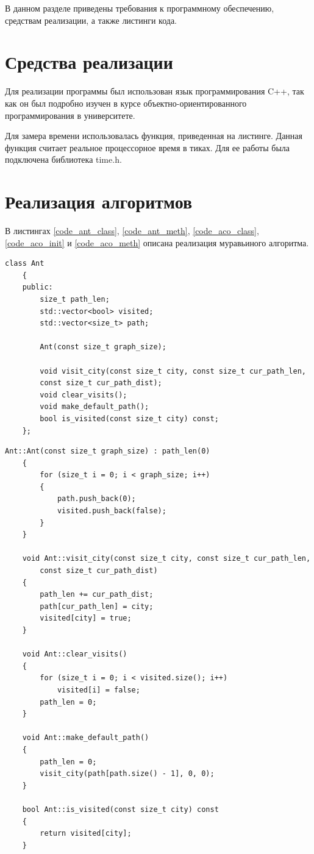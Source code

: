\documentclass[12pt, a4paper]{report}
\begin{document}
    В данном разделе приведены требования к программному обеспечению, средствам реализации, а также листинги кода.
    
    \section{Средства реализации}
    
    Для реализации программы был использован язык программирования C++, так как он был подробно изучен в курсе объектно-ориентированного программирования в университете\cite{C}.
    
    Для замера времени использовалась функция, приведенная на листинге\cite{time_b}. Данная функция считает реальное процессорное время в тиках. Для ее работы была подключена библиотека time.h.
   
    \section{Реализация алгоритмов}
    
    В листингах \ref{code_ant_class}, \ref{code_ant_meth}, \ref{code_aco_class}, \ref{code_aco_init} и \ref{code_aco_meth} описана реализация муравьиного алгоритма.
    
    \begin{lstlisting}[label=code_ant_class,caption=Класс муравья Ant]
    class Ant
    {
    public:
    	size_t path_len;
    	std::vector<bool> visited;
    	std::vector<size_t> path;
    
    	Ant(const size_t graph_size);
    
    	void visit_city(const size_t city, const size_t cur_path_len,
    	const size_t cur_path_dist);
    	void clear_visits();
    	void make_default_path();
    	bool is_visited(const size_t city) const;
    };
    \end{lstlisting}
    
    \begin{lstlisting}[label=code_ant_meth,caption=Методы класса Ant]
    Ant::Ant(const size_t graph_size) : path_len(0)
    {
    	for (size_t i = 0; i < graph_size; i++)
    	{
    		path.push_back(0);
    		visited.push_back(false);
    	}
    }
    
    void Ant::visit_city(const size_t city, const size_t cur_path_len,
    	const size_t cur_path_dist)
    {
    	path_len += cur_path_dist;
    	path[cur_path_len] = city;
    	visited[city] = true;
    }
    
    void Ant::clear_visits()
    {
    	for (size_t i = 0; i < visited.size(); i++)
    		visited[i] = false;
    	path_len = 0;
    }
    
    void Ant::make_default_path()
    {
    	path_len = 0;
    	visit_city(path[path.size() - 1], 0, 0);
    }
    
    bool Ant::is_visited(const size_t city) const
    {
    	return visited[city];
    }
    \end{lstlisting}
    
\end{document}
